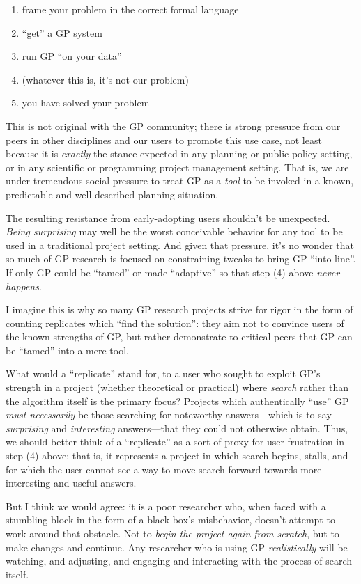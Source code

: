 \begin{enumerate}
\item frame your problem in the correct formal language
\item ``get'' a GP system
\item run GP ``on your data''
\item (whatever this is, it's not our problem)
\item you have solved your problem
\end{enumerate}

This is not original with the GP community; there is strong pressure from our peers in other disciplines and our users to promote this use case, not least because it is \emph{exactly} the stance expected in any planning or public policy setting, or in any scientific or programming project management setting. That is, we are under tremendous social pressure to treat GP as a \emph{tool} to be invoked in a known, predictable and well-described planning situation.

The resulting resistance from early-adopting users shouldn't be unexpected. \emph{Being surprising} may well be the worst conceivable behavior for any tool to be used in a traditional project setting. And given that pressure, it's no wonder that so much of GP research is focused on constraining tweaks to bring GP ``into line''. If only GP could be ``tamed'' or made ``adaptive'' so that step (4) above \emph{never happens}.

I imagine this is why so many GP research projects strive for rigor in the form of counting replicates which ``find the solution'': they aim not to convince users of the known strengths of GP, but rather demonstrate to critical peers that GP can be ``tamed'' into a mere tool.

What would a ``replicate'' stand for, to a user who sought to exploit GP's strength in a project (whether theoretical or practical) where \emph{search} rather than the algorithm itself is the primary focus? Projects which authentically ``use'' GP \emph{must necessarily} be those searching for noteworthy answers---which is to say \emph{surprising} and \emph{interesting} answers---that they could not otherwise obtain. Thus, we should better think of a ``replicate'' as a sort of proxy for user frustration in step (4) above: that is, it represents a project in which search begins, stalls, and for which the user cannot see a way to move search forward towards more interesting and useful answers.

But I think we would agree: it is a poor researcher who, when faced with a stumbling block in the form of a black box's misbehavior, doesn't attempt to work around that obstacle. Not to \emph{begin the project again from scratch}, but to make changes and continue. Any researcher who is using GP \emph{realistically} will be watching, and adjusting, and engaging and interacting with the process of search itself.


